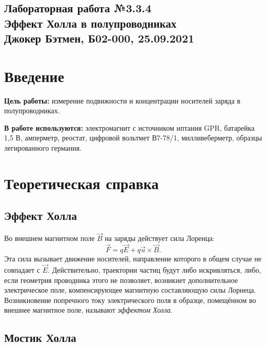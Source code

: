 \documentclass[a4paper,10pt]{article}
\begin{document}
  
\begin{center}
  \section*{Лабораторная работа №3.3.4 \\Эффект Холла в полупроводниках\\Джокер Бэтмен, Б02-000, 25.09.2021}
\end{center}  

\vspace{5mm}
\section*{Введение}

\begin{flushleft}
  \textbf{Цель работы:} измерение подвижности и концентрации носителей заряда в полупроводниках.

\end{flushleft}

\begin{flushleft}
  \textbf{В работе используются:} электромагнит с источником иптания GPR, батарейка 1,5 В, амперметр, реостат, цифровой вольтмет В7-78/1, милливеберметр, образцы легированного германия.

\end{flushleft}

\section*{Теоретическая справка}

\subsection*{Эффект Холла}

Во внешнем магнитном поле $\vec{B}$ на заряды действует сила Лоренца:\[\vec{F}=q\vec{E}+q\vec{u}\times\vec{B}.\]Эта сила вызывает движение носителей, направление которого в общем случае не совпадает с $\vec{E}$. Действительно, траектории частиц будут либо искривляться, либо, если геометрия проводника этого не позволяет, возникнет дополнительное электрическое поле, компенсирующее магнитную составляющую силы Лорнеца. Возникновение попречного току электрического поля в образце, помещённом во внешнее магнитное поле, называют \textit{эффектом Холла}.

\subsection*{Мостик Холла}
\end{document}
